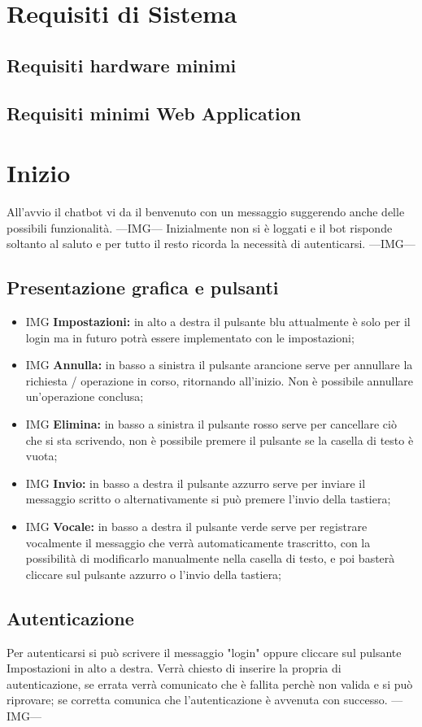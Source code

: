 \section{Requisiti di Sistema}
\subsection{Requisiti hardware minimi}
\subsection{Requisiti minimi Web Application}

\newpage
\section{Inizio}
All'avvio il chatbot vi da il benvenuto con un messaggio suggerendo anche delle possibili funzionalità.
---IMG--- \newline
Inizialmente non si è loggati e il bot risponde soltanto al saluto e per tutto il resto ricorda la necessità di autenticarsi.
---IMG--- \newline
\subsection{Presentazione grafica e pulsanti}
\begin{itemize}
    \item IMG \textbf{Impostazioni:} in alto a destra il pulsante blu attualmente è solo per il login ma in futuro potrà essere implementato con le impostazioni;
    \item IMG \textbf{Annulla:} in basso a sinistra il pulsante arancione serve per annullare la richiesta / operazione in corso, ritornando all'inizio. Non è possibile annullare un'operazione conclusa;
    \item IMG \textbf{Elimina:} in basso a sinistra il pulsante rosso serve per cancellare ciò che si sta scrivendo, non è possibile premere il pulsante se la casella di testo è vuota;
    \item IMG \textbf{Invio:} in basso a destra il pulsante azzurro serve per inviare il messaggio scritto o alternativamente si può premere l'invio della tastiera;
    \item IMG \textbf{Vocale:} in basso a destra il pulsante verde serve per registrare vocalmente il messaggio che verrà automaticamente trascritto, con la possibilità di modificarlo manualmente nella casella di testo, e poi basterà cliccare sul pulsante azzurro o l'invio della tastiera; 
\end{itemize}
\subsection{Autenticazione}
Per autenticarsi si può scrivere il messaggio "login" oppure cliccare sul pulsante Impostazioni in alto a destra. Verrà chiesto di inserire la propria  di autenticazione, se errata verrà comunicato che è fallita perchè non valida e si può riprovare; se corretta comunica che l'autenticazione è avvenuta con successo. ---IMG--- \newline

\newpage